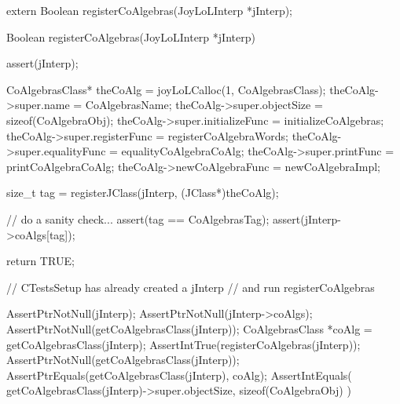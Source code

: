 \startCHeader
extern Boolean registerCoAlgebras(JoyLoLInterp *jInterp);
\stopCHeader
{}

\startCCode
Boolean registerCoAlgebras(JoyLoLInterp *jInterp) {
  assert(jInterp);
  
  CoAlgebrasClass* theCoAlg    =
    joyLoLCalloc(1, CoAlgebrasClass);
  theCoAlg->super.name           = CoAlgebrasName;
  theCoAlg->super.objectSize     = sizeof(CoAlgebraObj);
  theCoAlg->super.initializeFunc = initializeCoAlgebras;
  theCoAlg->super.registerFunc   = registerCoAlgebraWords;
  theCoAlg->super.equalityFunc   = equalityCoAlgebraCoAlg;
  theCoAlg->super.printFunc      = printCoAlgebraCoAlg;
  theCoAlg->newCoAlgebraFunc     = newCoAlgebraImpl;
  
  size_t tag =
    registerJClass(jInterp, (JClass*)theCoAlg);

  // do a sanity check...
  assert(tag == CoAlgebrasTag);
  assert(jInterp->coAlgs[tag]);

  return TRUE;
}
\stopCCode


\startCTest
  // CTestsSetup has already created a jInterp
  // and run registerCoAlgebras
  
  AssertPtrNotNull(jInterp);
  AssertPtrNotNull(jInterp->coAlgs);
  AssertPtrNotNull(getCoAlgebrasClass(jInterp));
  CoAlgebrasClass *coAlg =
    getCoAlgebrasClass(jInterp);
  AssertIntTrue(registerCoAlgebras(jInterp));
  AssertPtrNotNull(getCoAlgebrasClass(jInterp));
  AssertPtrEquals(getCoAlgebrasClass(jInterp), coAlg);
  AssertIntEquals(
    getCoAlgebrasClass(jInterp)->super.objectSize,
    sizeof(CoAlgebraObj)
  )
\stopCTest
\stopTestCase
\stopTestSuite

